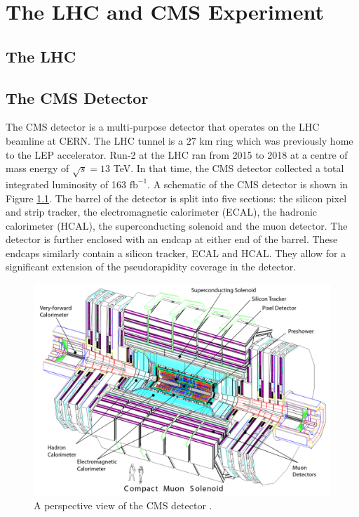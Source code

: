 \chapter{The LHC and CMS Experiment}
\label{sec:cms}

\section{The LHC}

\section{The CMS Detector}

The CMS detector is a multi-purpose detector that operates on the LHC beamline at CERN. The LHC tunnel is a \(27\) km ring which was previously home to the LEP accelerator. Run-2 at the LHC ran from 2015 to 2018 at a centre of mass energy of \(\sqrt{s} = 13\) TeV. In that time, the CMS detector collected a total integrated luminosity of 163 \(\text{fb}^{-1}\). A schematic of the CMS detector is shown in Figure \ref{fig:CMS_Schematic}. The barrel of the detector is split into five sections: the silicon pixel and strip tracker, the electromagnetic calorimeter (ECAL), the hadronic calorimeter (HCAL), the superconducting solenoid and the muon detector. The detector is further enclosed with an endcap at either end of the barrel. These endcaps similarly contain a silicon tracker, ECAL and HCAL. They allow for a significant extension of the pseudorapidity coverage in the detector.

\begin{figure}[H]
    \centering
    \includegraphics[scale=0.4]{Figures/CMS_Detector.png}
    \caption{A perspective view of the CMS detector \cite{CMS_Setup}.}
    \label{fig:CMS_Schematic}
\end{figure}

